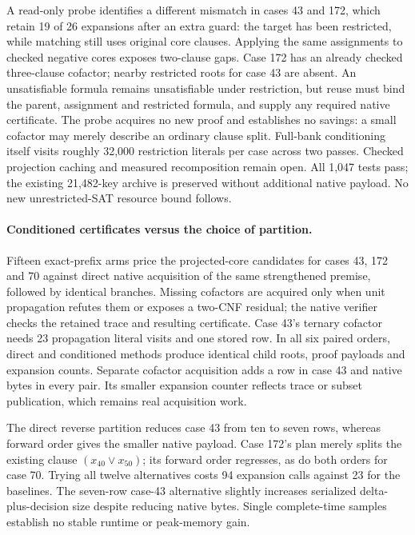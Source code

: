 \documentclass[11pt,a4paper]{article}
\numberwithin{equation}{section}
\theoremstyle{plain}
\theoremstyle{definition}
\theoremstyle{remark}
\begin{document}
A read-only probe identifies a different mismatch in cases 43 and 172, which
retain 19 of 26 expansions after an extra guard: the target has been restricted,
while matching still uses original core clauses. Applying the same assignments
to checked negative cores exposes two-clause gaps. Case 172 has an already
checked three-clause cofactor; nearby restricted roots for case 43 are absent.
An unsatisfiable formula remains unsatisfiable under restriction, but reuse must
bind the parent, assignment and restricted formula, and supply any required
native certificate. The probe acquires no new proof and establishes no savings:
a small cofactor may merely describe an ordinary clause split. Full-bank
conditioning itself visits roughly 32,000 restriction literals per case across
two passes. Checked projection caching and measured recomposition remain open.
All 1,047 tests pass; the existing 21,482-key archive is preserved without
additional native payload. No new unrestricted-SAT resource bound follows.

\paragraph{Conditioned certificates versus the choice of partition.}
Fifteen exact-prefix arms price the projected-core candidates for cases 43,
172 and 70 against direct native acquisition of the same strengthened premise,
followed by identical branches. Missing cofactors are acquired only when unit
propagation refutes them or exposes a two-CNF residual; the native verifier
checks the retained trace and resulting certificate. Case 43's ternary cofactor
needs 23 propagation literal visits and one stored row. In all six paired
orders, direct and conditioned methods produce identical child roots, proof
payloads and expansion counts. Separate cofactor acquisition adds a row in
case 43 and native bytes in every pair. Its smaller expansion counter reflects
trace or subset publication, which remains real acquisition work.

The direct reverse partition reduces case 43 from ten to seven rows, whereas
forward order gives the smaller native payload. Case 172's plan merely splits
the existing clause $(x_{40}\lor x_{50})$; its forward order regresses, as do both orders
for case 70. Trying all twelve alternatives costs 94 expansion calls against
23 for the baselines. The seven-row case-43 alternative slightly increases
serialized delta-plus-decision size despite reducing native bytes. Single
complete-time samples establish no stable runtime or peak-memory gain.
\end{document}
